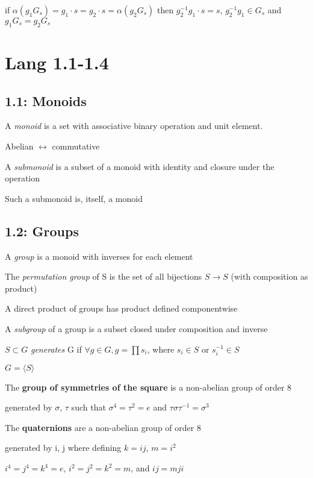 \documentclass[12pt]{article}
\begin{document}
if $\alpha(g_1G_s) = g_1 \cdot s = g_2 \cdot s = \alpha(g_2G_s)$
then $g_2^{-1}g_1 \cdot s = s$, $g_2^{-1}g_1 \in G_s$ and $g_1G_s = g_2G_s$

\section{Lang 1.1-1.4}

\subsection{1.1: Monoids}

\noindent
A \textit{monoid} is a set with associative binary operation and unit element.

Abelian $\leftrightarrow$ commutative

\noindent
A \textit{submonoid} is a subset of a monoid with identity and closure under the operation

Such a submonoid is, itself, a monoid

\subsection{1.2: Groups}

\noindent
A \textit{group} is a monoid with inverses for each element

\noindent
The \textit{permutation group} of S is the set of all bijections $S \to S$ (with composition as product)

\noindent
A direct product of groups has product defined componentwise

\noindent
A \textit{subgroup} of a group is a subset closed under composition and inverse

\noindent
$S \subset G$ \textit{generates} G if $\forall g \in G, g = \prod s_i$, where $s_i \in S$ or $s_i^{-1} \in S$

$G = \langle S \rangle$

\noindent
The \textbf{group of symmetries of the square} is a non-abelian group of order 8

generated by $\sigma$, $\tau$ such that $\sigma^4 = \tau^2 = e$ and $\tau \sigma \tau^{-1} = \sigma^3$

\noindent
The \textbf{quaternions} are a non-abelian group of order 8

generated by i, j where defining $k = ij$, $m = i^2$

$i^4 = j^4 = k^4 = e$, $i^2 = j^2 = k^2 = m$, and $ij = mji$
\end{document}
